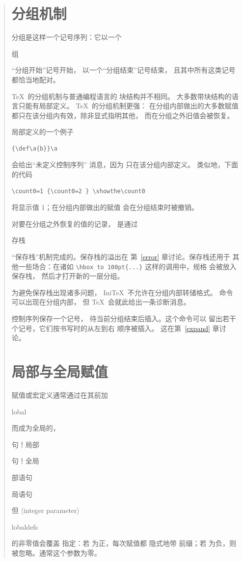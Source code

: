 \documentclass[a4paper]{rapport3}
\makeatletter
\def\gr#1{$\langle$#1$\rangle$}\def\key#1{{\tt#1}}
\def\IniTeX{Ini\TeX}\def\LamsTeX{LAMS\TeX}\def\VirTeX{Vir\TeX}
\newenvironment{disp}{\begin{quotation}}{\end{quotation}}
\def\term#1\par{\index{#1}}
\def\cstoidx#1\par{\index{#1@\cs{#1}}}
\def\csidx#1{\cstoidx #1\par\cs{#1}}
\makeatother
\begin{document}
\begin{disp}
\section{分组机制}

分组是这样一个记号序列：它以一个
\term 分组\par
“分组开始”记号开始，
以一个“分组结束”记号结束，
且其中所有这类记号都恰当地配对。 

\TeX\ 的分组机制与普通编程语言的
块结构并不相同。
大多数带块结构的语言只能有局部定义。
\TeX\ 的分组机制更强：
在分组内部做出的大多数赋值
都只在该分组内有效，除非显式指明其他，
而在分组之外旧值会被恢复。

局部定义的一个例子
\begin{verbatim}
{\def\a{b}}\a
\end{verbatim}
会给出“未定义控制序列”
消息，因为  只在该分组内部定义。
类似地，下面的代码
\begin{verbatim}
\count0=1 {\count0=2 } \showthe\count0
\end{verbatim}
将显示值 1；在分组内部做出的赋值
会在分组结束时被撤销。


对要在分组之外恢复的值的记录，
是通过
\term 保存栈\par
“保存栈”机制完成的。保存栈的溢出在
第~\ref{error} 章讨论。保存栈还用于
其他一些场合：在诸如 \hbox{\verb>\hbox to 100pt{...}>}
这样的调用中，规格 \hbox{} 会被放入保存栈，
然后才打开新的一层分组。

为避免保存栈出现诸多问题，
\IniTeX\ 不允许在分组内部转储格式。
 命令可以出现在分组内部，
但 \TeX\ 会就此给出一条诊断消息。

 控制序列保存一个记号，
待当前分组结束后插入。这个命令可以
留出若干个记号，它们按书写时的从左到右
顺序被插入。
这在第~\ref{expand} 章讨论。


\section{局部与全局赋值}
\label{global:assign}

赋值或宏定义通常通过在其前加 \csidx{global}
而成为全局的，
\term 语句！局部\par\term 语句！全局\par
\term 局部语句\par\term 全局语句\par
但 \gr{integer parameter}
\csidx{globaldefs} 的非零值会覆盖 
指定：若  为正，每次赋值都
隐式地带  前缀；若
 为负，则 
被忽略。通常这个参数为零。


\end{disp}
\end{document}

